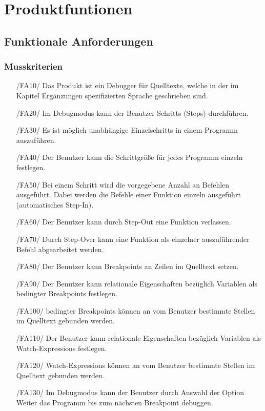 \documentclass[parskip=full]{scrartcl}
\begin{document}
\newpage

\section{Produktfuntionen}
	 	\subsection{Funktionale Anforderungen}
 		\subsubsection{Musskriterien}
		\begin{itemize}
		\item[/FA10/] Das Produkt ist ein Debugger für Quelltexte, welche in der im Kapitel Ergänzungen spezifizierten Sprache geschrieben sind.
		\item[/FA20/] Im Debugmodus kann der Benutzer \glspl{Schritt} (Steps) durchführen.
		\item[/FA30/] Es ist möglich unabhängige \glspl{Einzelschritt} in einem Programm auszuführen.
		\item[/FA40/] Der Benutzer kann die Schrittgröße für jedes Programm einzeln festlegen.
		\item[/FA50/] Bei einem \gls{Schritt} wird die vorgegebene Anzahl an Befehlen ausgeführt. Dabei werden die Befehle einer Funktion einzeln ausgeführt (automatisches Step-In). 
		\item[/FA60/] Der Benutzer kann durch \gls{Step-Out} eine Funktion verlassen.
		\item[/FA70/] Durch \gls{Step-Over} kann eine Funktion als einzelner auszuführender Befehl abgearbeitet werden.
		\item[/FA80/] Der Benutzer kann \glspl{Breakpoint} an Zeilen im Quelltext setzen.
		\item[/FA90/] Der Benutzer kann relationale Eigenschaften bezüglich Variablen als \glspl{bedingter Breakpoint} festlegen.
		\item[/FA100/] \glspl{bedingter Breakpoint} können an vom Benutzer bestimmte Stellen im Quelltext gebunden werden.
		\item[/FA110/] Der Benutzer kann relationale Eigenschaften bezüglich Variablen als \glspl{Watch-Expression} festlegen.
		\item[/FA120/] \glspl{Watch-Expression} können an vom Benutzer bestimmte Stellen im Quelltext gebunden werden.
		\item[/FA130/] Im \gls{Debugmodus} kann der Benutzer durch Auswahl der Option Weiter das Programm bis zum nächsten Breakpoint debuggen.

\end{itemize}
\end{document}

